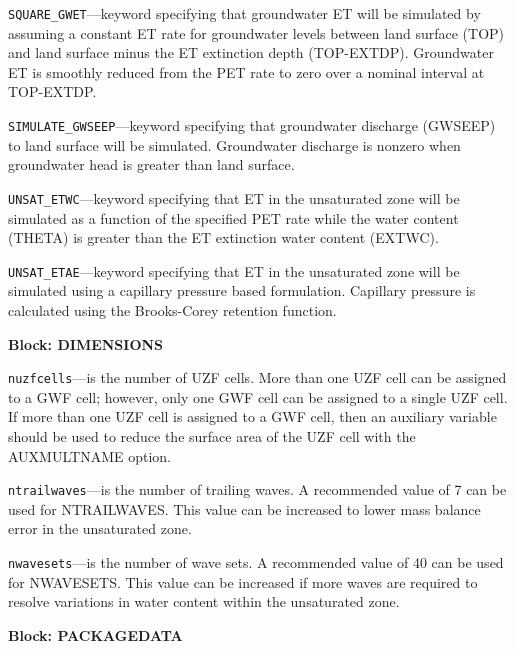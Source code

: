 \begin{description}
\item \texttt{SQUARE\_GWET}---keyword specifying that groundwater ET will be simulated by assuming a constant ET rate for groundwater levels between land surface (TOP) and land surface minus the ET extinction depth (TOP-EXTDP). Groundwater ET is smoothly reduced from the PET rate to zero over a nominal interval at TOP-EXTDP.

\item \texttt{SIMULATE\_GWSEEP}---keyword specifying that groundwater discharge (GWSEEP) to land surface will be simulated. Groundwater discharge is nonzero when groundwater head is greater than land surface.

\item \texttt{UNSAT\_ETWC}---keyword specifying that ET in the unsaturated zone will be simulated as a function of the specified PET rate while the water content (THETA) is greater than the ET extinction water content (EXTWC).

\item \texttt{UNSAT\_ETAE}---keyword specifying that ET in the unsaturated zone will be simulated using a capillary pressure based formulation. Capillary pressure is calculated using the Brooks-Corey retention function.

\end{description}
\item \textbf{Block: DIMENSIONS}

\begin{description}
\item \texttt{nuzfcells}---is the number of UZF cells.  More than one UZF cell can be assigned to a GWF cell; however, only one GWF cell can be assigned to a single UZF cell. If more than one UZF cell is assigned to a GWF cell, then an auxiliary variable should be used to reduce the surface area of the UZF cell with the AUXMULTNAME option.

\item \texttt{ntrailwaves}---is the number of trailing waves.  A recommended value of 7 can be used for NTRAILWAVES.  This value can be increased to lower mass balance error in the unsaturated zone.

\item \texttt{nwavesets}---is the number of wave sets.  A recommended value of 40 can be used for NWAVESETS.  This value can be increased if more waves are required to resolve variations in water content within the unsaturated zone.

\end{description}
\item \textbf{Block: PACKAGEDATA}

